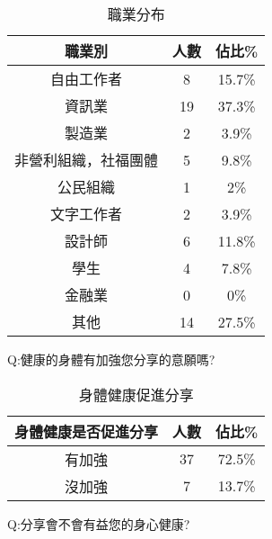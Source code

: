 \begin{center} 
\begin{table}[h]
\centering
\caption{職業分布}
\label{4_1_prof}
\begin{tabular}{ccc} \hline
職業別&	人數 &	佔比\% \\ \hline
自由工作者&	8&	15.7\% \\ \hline
資訊業&	19&	37.3\% \\ \hline
製造業&	2	&3.9\% \\ \hline
非營利組織，社福團體&	5&	9.8\% \\ \hline
公民組織&	1&	2\% \\ \hline
文字工作者&	2&	3.9\% \\ \hline
設計師	&6&	11.8\% \\ \hline
學生	&4&	7.8\% \\ \hline
金融業	&0&	0\% \\ \hline
其他	&14&	27.5\% \\ \hline
\end{tabular}
\end{table}
\end{center}






Q:健康的身體有加強您分享的意願嗎?

\begin{center} 
\begin{table}[h]
\centering
\caption{身體健康促進分享}
\label{4_1_health_force}
\begin{tabular}{ccc} \hline
身體健康是否促進分享&	人數 &	佔比\% \\ \hline
有加強&	37	&72.5\% \\ \hline
沒加強&	7	&13.7\% \\ \hline
\end{tabular}
\end{table}
\end{center}



Q:分享會不會有益您的身心健康?


